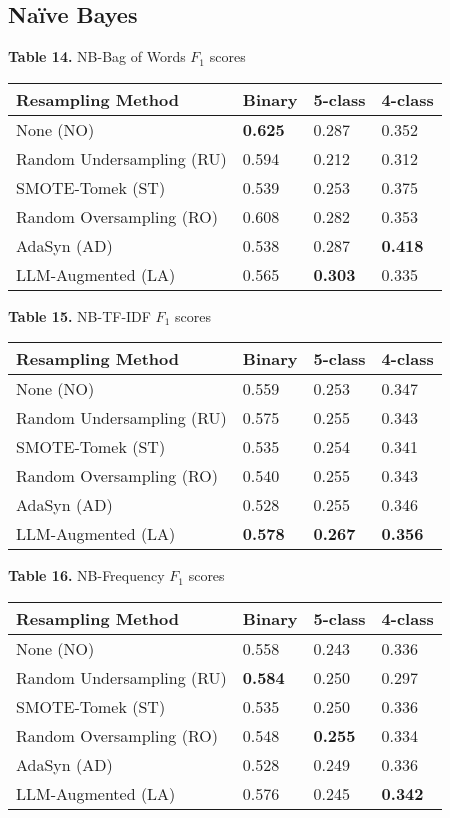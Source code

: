 \documentclass[runningheads]{llncs}
\newenvironment{nscenter}
 {\parskip=0pt\par\nopagebreak\centering}
 {\par\noindent\ignorespacesafterend}
\begin{document}
\subsection{Naïve Bayes}

\begin{nscenter}
{\bf Table 14.} NB-Bag of Words $F_1$ scores\\

\begin{tabular}{|l|l|l|l|}
\hline
Resampling Method & Binary & 5-class & 4-class \\\hline
None (NO) & {\bf 0.625} & 0.287 & 0.352 \\\hline
Random Undersampling (RU) & 0.594 & 0.212 & 0.312 \\\hline
SMOTE-Tomek (ST) & 0.539 & 0.253 & 0.375 \\\hline
Random Oversampling (RO) & 0.608 & 0.282 & 0.353 \\\hline
AdaSyn (AD) & 0.538 & 0.287 & {\bf 0.418} \\\hline
LLM-Augmented (LA) & 0.565 & {\bf 0.303} & 0.335 \\\hline
\end{tabular}
\end{nscenter}

\begin{nscenter}
{\bf Table 15.} NB-TF-IDF $F_1$ scores\\

\begin{tabular}{|l|l|l|l|}
\hline
Resampling Method & Binary & 5-class & 4-class \\\hline
None (NO) & 0.559 & 0.253 & 0.347 \\\hline
Random Undersampling (RU) & 0.575 & 0.255 & 0.343 \\\hline
SMOTE-Tomek (ST) & 0.535 & 0.254 & 0.341 \\\hline
Random Oversampling (RO) & 0.540 & 0.255 & 0.343 \\\hline
AdaSyn (AD) & 0.528 & 0.255 & 0.346 \\\hline
LLM-Augmented (LA) & {\bf 0.578} & {\bf 0.267} & {\bf 0.356} \\\hline
\end{tabular}
\end{nscenter}


\begin{nscenter}
{\bf Table 16.} NB-Frequency $F_1$ scores\\

\begin{tabular}{|l|l|l|l|}
\hline
Resampling Method & Binary & 5-class & 4-class \\\hline
None (NO) & 0.558 & 0.243 & 0.336 \\\hline
Random Undersampling (RU) & {\bf 0.584} & 0.250 & 0.297 \\\hline
SMOTE-Tomek (ST) & 0.535 & 0.250 & 0.336 \\\hline
Random Oversampling (RO) & 0.548 & {\bf 0.255} & 0.334 \\\hline
AdaSyn (AD) & 0.528 & 0.249 & 0.336 \\\hline
LLM-Augmented (LA) & 0.576 & 0.245 & {\bf 0.342} \\\hline
\end{tabular}
\end{nscenter}
\end{document}
